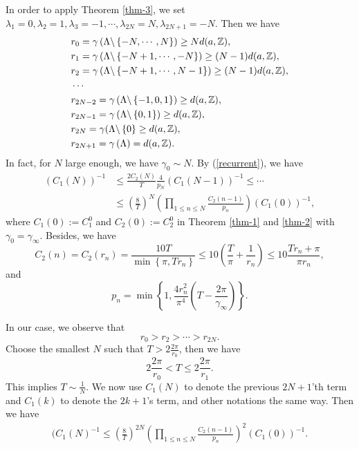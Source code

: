 In order to apply Theorem \ref{thm-3}, we set $\lambda_1=0,\lambda_2=1,\lambda_3=-1,\cdots ,\lambda_{2N}=N,\lambda_{2N+1}=-N$. Then we have
\begin{align*}
  &r_0=\gamma\left( \Lambda\backslash \left\{-N,\cdots ,N\right\}  \right)\ge Nd(a,\mathbb{Z}),\\ 
  &r_1= \gamma\left( \Lambda \backslash \left\{-N+1,\cdots ,-N\right\}  \right)\ge (N-1)d(a,\mathbb{Z}),\\
  &r_2=\gamma\left( \Lambda\backslash \left\{-N+1,\cdots ,N-1\right\}  \right) \ge (N-1)d(a,\mathbb{Z}),\\
  &\cdots \\
  &r_{2N-2}=\gamma\left( \Lambda\backslash \left\{-1,0,1\right\}  \right) \ge d(a,\mathbb{Z}),\\
  &r_{2N-1}=\gamma\left( \Lambda\backslash \left\{0,1\right\}  \right) \ge d(a,\mathbb{Z}),\\
  &r_{2N}=\gamma(\Lambda \backslash \left\{0\right\}\ge d(a,\mathbb{Z}),\\
  &r_{2N+1}=\gamma\left( \Lambda \right) =d(a,\mathbb{Z})
.\end{align*}
In fact, for $N$ large enough, we have $\gamma_0\sim N$.
By (\ref{recurrent}), we have
\begin{align*}
  \left( C_1(N) \right) ^{-1}&\le \frac{2C_2(N)}{T}\frac{4}{p_N}\left( C_1(N-1) \right) ^{-1}\le \cdots \\
  &\le \left( \frac{8}{T} \right) ^{N}\left( \prod_{1\le n\le N}\frac{C_{2}(n-1)}{p_n} \right)(C_1(0))^{-1} 
,\end{align*}
where $C_1(0):=C_1^{0}$ and $C_2(0):=C_2^{0}$ in Theorem \ref{thm-1} and \ref{thm-2} with $\gamma_0=\gamma_{\infty}$.
Besides, we have
\begin{equation}
  C_2(n)=C_2(r_n)=\frac{10T}{\min \left\{\pi,Tr_n\right\} }\le 10\left( \frac{T}{\pi}+\frac{1}{r_n} \right)\le 10 \frac{Tr_n+\pi}{\pi r_n}  ,
\end{equation}
and
\begin{equation}
  p_n=\min \left\{1, \frac{4r_n^2}{\pi^4}\left( T-\frac{2\pi}{\gamma_{\infty}} \right) \right\}.
\end{equation}

In our case, we observe that 
\[
  r_0>r_2>\cdots >r_{2N}.
\] 
Choose the smallest $N$ such that $T>2\frac{2\pi}{r_0}$, then we have
\begin{equation}
  2\frac{2\pi}{r_0}< T\le 2 \frac{2\pi}{r_1}.
\end{equation}
This implies $T\sim \frac{1}{N}$.
We now use $C_1(N)$ to denote the previous $2N+1$'th term and $C_1(k)$ to denote the  $2k+1$'s term, and other notations the same way.  Then we have
\begin{align*}
  (C_1(N)^{-1}\le \left( \frac{8}{T} \right) ^{2N}\left( \prod_{1\le n\le N}\frac{C_2(n-1)}{p_n} \right) ^2\left( C_1(0) \right) ^{-1}
.\end{align*}

